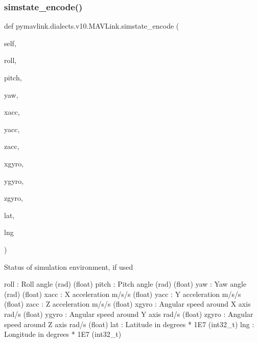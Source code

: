 \begin{DoxyVerb}
\begin{DoxyVerb}
\begin{DoxyVerb}
\begin{DoxyVerb}
\begin{DoxyVerb}
\begin{DoxyVerb}
\begin{DoxyVerb}
\begin{DoxyVerb}
\begin{DoxyVerb}
\begin{DoxyVerb}
\subsubsection{\texorpdfstring{simstate\+\_\+encode()}{simstate\_encode()}}
{\footnotesize\ttfamily def pymavlink.\+dialects.\+v10.\+M\+A\+V\+Link.\+simstate\+\_\+encode (\begin{DoxyParamCaption}\item[{}]{self,  }\item[{}]{roll,  }\item[{}]{pitch,  }\item[{}]{yaw,  }\item[{}]{xacc,  }\item[{}]{yacc,  }\item[{}]{zacc,  }\item[{}]{xgyro,  }\item[{}]{ygyro,  }\item[{}]{zgyro,  }\item[{}]{lat,  }\item[{}]{lng }\end{DoxyParamCaption})}

\begin{DoxyVerb}Status of simulation environment, if used

roll                      : Roll angle (rad) (float)
pitch                     : Pitch angle (rad) (float)
yaw                       : Yaw angle (rad) (float)
xacc                      : X acceleration m/s/s (float)
yacc                      : Y acceleration m/s/s (float)
zacc                      : Z acceleration m/s/s (float)
xgyro                     : Angular speed around X axis rad/s (float)
ygyro                     : Angular speed around Y axis rad/s (float)
zgyro                     : Angular speed around Z axis rad/s (float)
lat                       : Latitude in degrees * 1E7 (int32_t)
lng                       : Longitude in degrees * 1E7 (int32_t)\end{DoxyVerb}
 \mbox{\label{classpymavlink_1_1dialects_1_1v10_1_1MAVLink_a0f6b9b39ed82d9302c812d720682be22}} 

\end{DoxyVerb}
\end{DoxyVerb}
\end{DoxyVerb}
\end{DoxyVerb}
\end{DoxyVerb}
\end{DoxyVerb}
\end{DoxyVerb}
\end{DoxyVerb}
\end{DoxyVerb}
\end{DoxyVerb}
